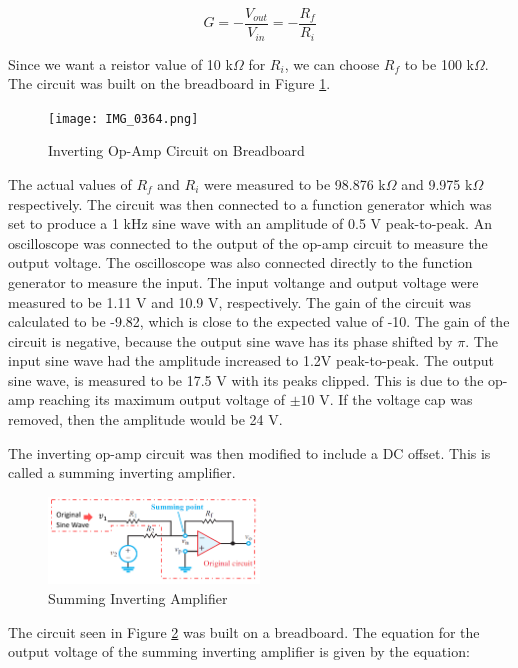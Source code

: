 \documentclass[12pt]{article}
\begin{document}
\begin{equation*}
	G = -\frac{V_{out}}{V_{in}} = -\frac{R_f}{R_i}
\end{equation*}

Since we want a reistor value of 10 k$\Omega$ for $R_i$, we can choose
$R_f$ to be 100 k$\Omega$. The circuit was built on the breadboard in 
Figure \ref{fig:fig3}.

\begin{figure}[H]
	\centering
	\texttt{[image: IMG\_0364.png]}
	\caption{Inverting Op-Amp Circuit on Breadboard}
	\label{fig:fig3}
\end{figure}

The actual values of $R_f$ and $R_i$ were measured to be 98.876 k$\Omega$
and 9.975 k$\Omega$ respectively. The circuit was then connected to 
a function generator which was set to produce a 1 kHz sine wave with an 
amplitude of 0.5 V peak-to-peak. An oscilloscope was connected to the
output of the op-amp circuit to measure the output voltage. The oscilloscope
was also connected directly to the function generator to measure the input.
The input voltange and output voltage were measured to be 1.11 V and 10.9 V,
respectively. The gain of the circuit was calculated to be -9.82, which is
close to the expected value of -10. The gain of the circuit is negative, because
the output sine wave has its phase shifted by $\pi$. The input sine wave
had the amplitude increased to 1.2V peak-to-peak. The output sine wave,
is measured to be 17.5 V with its peaks clipped. This is due to the 
op-amp reaching its maximum output voltage of $\pm 10$ V. If the voltage
cap was removed, then the amplitude would be 24 V.
\newline

The inverting op-amp circuit was then modified to include a DC offset. This
is called a summing inverting amplifier.

\begin{figure}[H]
	\centering
	\includegraphics[width=0.5\textwidth]{summing inverting amplifier.png}
	\caption{Summing Inverting Amplifier}
	\label{fig:fig4}
\end{figure}

The circuit seen in Figure \ref{fig:fig4} was built on a breadboard. The
equation for the output voltage of the summing inverting amplifier is given
by the equation:
\end{document}
